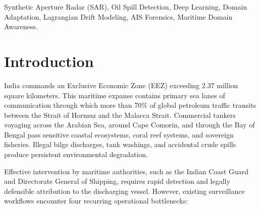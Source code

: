 \documentclass[conference]{IEEEtran}
\begin{document}
\begin{IEEEkeywords}
Synthetic Aperture Radar (SAR), Oil Spill Detection, Deep Learning, Domain Adaptation, Lagrangian Drift Modeling, AIS Forensics, Maritime Domain Awareness.
\end{IEEEkeywords}

\section{Introduction}

India commands an Exclusive Economic Zone (EEZ) exceeding 2.37 million square kilometers. This maritime expanse contains primary sea lanes of communication through which more than 70\% of global petroleum traffic transits between the Strait of Hormuz and the Malacca Strait. Commercial tankers voyaging across the Arabian Sea, around Cape Comorin, and through the Bay of Bengal pass sensitive coastal ecosystems, coral reef systems, and sovereign fisheries. Illegal bilge discharges, tank washings, and accidental crude spills produce persistent environmental degradation.

Effective intervention by maritime authorities, such as the Indian Coast Guard and Directorate General of Shipping, requires rapid detection and legally defensible attribution to the discharging vessel. However, existing surveillance workflows encounter four recurring operational bottlenecks:
\end{document}

